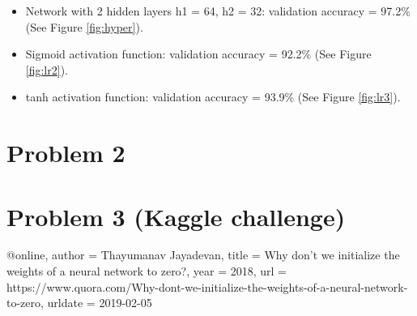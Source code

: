 \documentclass[a4paper]{article}
\begin{document}
\begin{enumerate}
\begin{itemize}

\item Network with 2 hidden layers h1 = 64, h2 = 32: validation accuracy = 97.2\% (See Figure \ref{fig:hyper}).

\item Sigmoid activation function: validation accuracy = 92.2\% (See Figure \ref{fig:lr2}).

\item tanh activation function: validation accuracy = 93.9\% (See Figure \ref{fig:lr3}).  
  
\end{itemize}


\end{enumerate}

\section{Problem 2}
\label{sec:problem1}

\section{Problem 3 (Kaggle challenge)}
\label{sec:problem1}


\begin{thebibliography}
@online{,
  author = {Thayumanav Jayadevan},
  title = {Why don't we initialize the weights of a neural network to zero?},
  year = 2018,
  url = {https://www.quora.com/Why-dont-we-initialize-the-weights-of-a-neural-network-to-zero},
  urldate = {2019-02-05}
}
\end{thebibliography}
\end{document}
